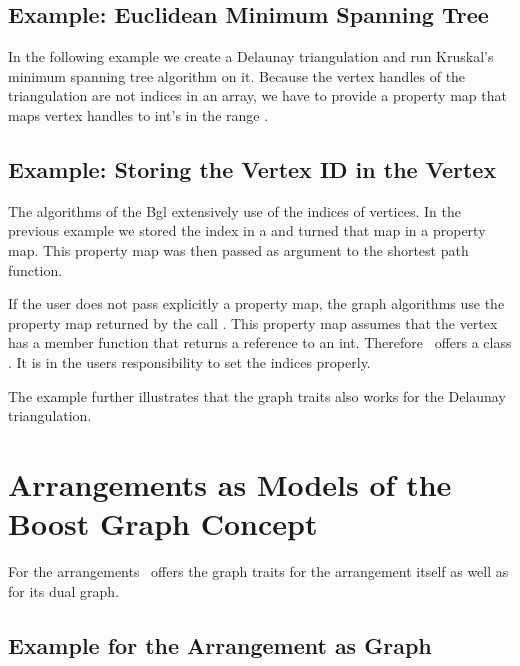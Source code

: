 \subsection{Example: Euclidean Minimum Spanning Tree}

In the following example we create a Delaunay triangulation and run Kruskal's minimum
spanning tree algorithm on it. Because the vertex handles of the triangulation are not indices
in an array, we have to provide a property map that maps vertex handles to
int's in the range \ccc{[0, t.number_of_vertices())}.



\subsection{Example: Storing the Vertex ID in the Vertex}

The algorithms of the {\sc Bgl} extensively use of the indices of
vertices. In the previous example we stored the index in a 
and turned that map in a property map. This property map was then
passed as argument to the shortest path function.

If the user does not pass explicitly a property map, the graph algorithms
use the property map returned by the call .
This property map assumes that the vertex has a 
member function  that returns a reference to an int.
Therefore \cgal\ offers a class .
It is in the users responsibility to set the indices properly.

The example further illustrates that the graph traits also works
for the Delaunay triangulation.



\section{Arrangements as Models of the Boost Graph Concept}

For the arrangements \cgal\ offers the graph traits for the arrangement
itself as well as for its dual graph.


\subsection{Example for the Arrangement as Graph\label{arr_sssec:bgl_primal}}

